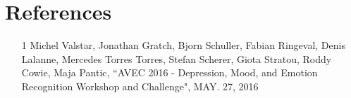 \documentclass{article}
\begin{document}
	\section{References}
	\begin{itemize}
		\item
		[1] Michel Valstar, Jonathan Gratch, Bjorn Schuller, Fabian Ringeval, Denis Lalanne, Mercedes Torres Torres, Stefan Scherer, Giota Stratou, Roddy Cowie, Maja Pantic, ``AVEC 2016 - Depression, Mood, and Emotion Recognition Workshop and Challenge", MAY. 27, 2016 \\
	\end{itemize}
\end{document}
